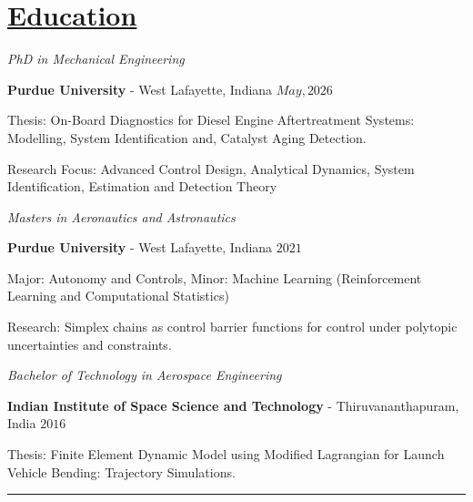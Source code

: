 \section*{\underline{Education}}

\noindent \textit{PhD in Mechanical Engineering}

\textbf{Purdue University} - West Lafayette, Indiana \hfill $May, 2026$

Thesis: On-Board Diagnostics for Diesel Engine Aftertreatment Systems: Modelling, System Identification and, Catalyst Aging Detection.

Research Focus: Advanced Control Design, Analytical Dynamics, System Identification, Estimation and Detection Theory

\medskip

\noindent \textit{Masters in Aeronautics and Astronautics}

\textbf{Purdue University} - West Lafayette, Indiana \hfill $2021$

Major: Autonomy and Controls, Minor: Machine Learning (Reinforcement Learning and Computational Statistics)

Research: Simplex chains as control barrier functions for control under polytopic uncertainties and constraints.

\medskip

\noindent \textit{Bachelor of Technology in Aerospace Engineering }

\textbf{Indian Institute of Space Science and Technology} - Thiruvananthapuram, India \hfill $2016 $

Thesis: Finite Element Dynamic Model using Modified Lagrangian for Launch Vehicle Bending: Trajectory Simulations.

\noindent\rule{\textwidth}{0.4pt}
